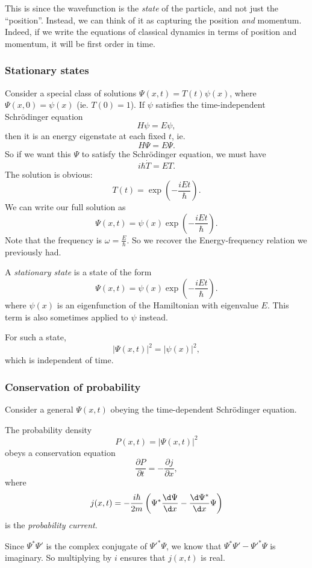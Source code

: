 \documentclass[a4paper]{article}
\begin{document}
This is since the wavefunction is the \emph{state} of the particle, and not just the ``position''. Instead, we can think of it as capturing the position \emph{and} momentum. Indeed, if we write the equations of classical dynamics in terms of position and momentum, it will be first order in time.

\subsubsection{Stationary states}
Consider a special class of solutions $\Psi(x, t) = T(t) \psi(x)$, where $\Psi(x, 0) = \psi(x)$ (ie. $T(0) = 1$). If $\psi$ satisfies the time-independent Schr\"odinger equation
\[
  H\psi = E\psi,
\]
then it is an energy eigenstate at each fixed $t$, ie.
\[
  H\Psi = E\Psi.
\]
So if we want this $\Psi$ to satisfy the Schr\"odinger equation, we must have
\[
  i\hbar \dot{T} = ET.
\]
The solution is obvious:
\[
  T(t) = \exp\left(-\frac{iEt}{\hbar}\right).
\]
We can write our full solution as
\[
  \Psi(x, t) = \psi(x) \exp\left(-\frac{iEt}{\hbar}\right).
\]
Note that the frequency is $\omega = \frac{E}{\hbar}$. So we recover the Energy-frequency relation we previously had.

\begin{defi}
  A \emph{stationary state} is a state of the form
  \[
    \Psi(x, t) = \psi(x) \exp\left(-\frac{iEt}{\hbar}\right).
  \]
  where $\psi(x)$ is an eigenfunction of the Hamiltonian with eigenvalue $E$. This term is also sometimes applied to $\psi$ instead.
\end{defi}
For such a state,
\[
  |\Psi(x, t)|^2 = |\psi(x)|^2,
\]
which is independent of time.

\subsubsection{Conservation of probability}
Consider a general $\Psi(x, t)$ obeying the time-dependent Schr\"odinger equation.

\begin{prop}
  The probability density
  \[
    P(x, t) = |\Psi(x, t)|^2
  \]
  obeys a conservation equation
  \[
    \frac{\partial P}{\partial t} = - \frac{\partial j}{\partial x},
  \]
  where
  \[
    j(x, t) = -\frac{i\hbar}{2m} \left(\Psi^*\frac{\d \Psi}{\d x} - \frac{\d \Psi^*}{\d x} \Psi\right)
  \]
  is the \emph{probability current}.
\end{prop}
Since $\Psi^* \Psi'$ is the complex conjugate of $\Psi'^* \Psi$, we know that $\Psi^*\Psi' - \Psi'^* \Psi$ is imaginary. So multiplying by $i$ ensures that $j(x, t)$ is real.
\end{document}
